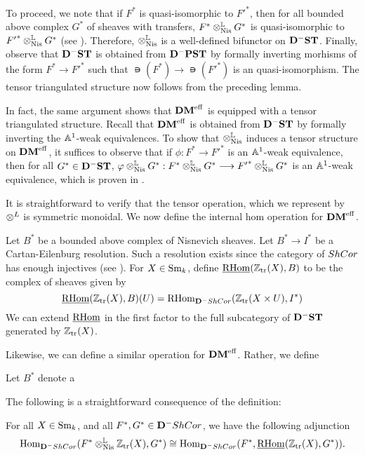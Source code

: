 To proceed, we note that if $F^*$ is quasi-isomorphic to ${F'}^*$,
then for all bounded above complex $G^*$ of sheaves with transfers, 
$F^* \otimes^{\mathbb{L}}_{\mathrm{Nis}} G^*$ is quasi-isomorphic to ${F'}^* \otimes^{\mathbb{L}}_{\mathrm{Nis}} G^*$ (see
\cite[Prop. 8.16]{MVW}). Therefore, $\otimes^{\mathbb{L}}_{\mathrm{Nis}}$ is a well-defined 
bifunctor on $\mathbf{D}^-\mathbf{ST}$. Finally, observe that $\mathbf{D}^-\mathbf{ST}$ is 
obtained from $\mathbf{D}^-\mathbf{PST}$ by formally inverting morhisms of the 
form $F^* \to {F'}^*$ such that $\nis(F^*) \to \nis({F'}^*)$ is an 
quasi-isomorphism. The tensor triangulated structure now follows 
from the preceding lemma.

In fact, the same argument shows that $\mathbf{DM}^{\mathrm{eff}}$ is equipped with a
tensor triangulated structure. Recall that $\mathbf{DM}^{\mathrm{eff}}$ is obtained
from $\mathbf{D}^-\mathbf{ST}$ by formally inverting the $\mathbb{A}^1$-weak equivalences.
To show that $\otimes^{\mathbb{L}}_{\mathrm{Nis}}$ induces a tensor structure on $\mathbf{DM}^{\mathrm{eff}}$, it
suffices to observe that if $\phi : F^* \to {F'}^*$ is an $\mathbb{A}^1$-weak 
equivalence, then for all $G^* \in \mathbf{D}^-\mathbf{ST}$, $\varphi \otimes^{\mathbb{L}}_{\mathrm{Nis}} G^* : 
F^* \otimes^{\mathbb{L}}_{\mathrm{Nis}} G^* \longrightarrow {F'}^* \otimes^{\mathbb{L}}_{\mathrm{Nis}} G^*$ is an $\mathbb{A}^1$-weak 
equivalence, which is proven in \cite[Lemma 9.5]{MVW}.

It is straightforward to verify that the tensor operation, which
we represent by $\otimes^L$ is symmetric monoidal. We now define the 
internal hom operation for $\mathbf{DM}^{\mathrm{eff}}$.

\begin{defn}
Let $B^*$ be a bounded above complex of Nisnevich sheaves. Let $B^*
\to I^*$ be a Cartan-Eilenburg resolution. Such a resolution 
exists since the category of $ShCor$ has enough injectives (see 
\cite[Prop.  6.19]{MVW}). For $X \in \mathrm{Sm}_{k}$, define 
$\underline{\mathrm{RHom}}(\mathbb{Z}_{\mathrm{tr}}(X), B)$ to be the complex of sheaves given by
\[
\underline{\mathrm{RHom}}(\mathbb{Z}_{\mathrm{tr}}(X), B)(U) = \mathrm{RHom}_{\mathbf{D}^-ShCor}(\mathbb{Z}_{\mathrm{tr}}(X \times U),
I^*)
\]
We can extend $\underline{\mathrm{RHom}}$ in the first factor to the full 
subcategory of $\mathbf{D}^-\mathbf{ST}$ generated by $\mathbb{Z}_{\mathrm{tr}}(X)$.
\end{defn}

Likewise, we can define a similar operation for $\mathbf{DM}^{\mathrm{eff}}$. Rather,
we define

\begin{defn}
Let $B^*$ denote a 
\end{defn}


The following is a straightforward consequence of the definition:

\begin{lem}
For all $X \in \mathrm{Sm}_{k}$, and all $F^*, G^* \in \mathbf{D}^-ShCor$, we have
the following adjunction
\[
\mathrm{Hom}_{\mathbf{D}^-ShCor}(F^*\otimes^{\mathbb{L}}_{\mathrm{Nis}} \mathbb{Z}_{\mathrm{tr}}(X), G^*) \cong
\mathrm{Hom}_{\mathbf{D}^-ShCor}(F^*, \underline{\mathrm{RHom}}(\mathbb{Z}_{\mathrm{tr}}(X), G^*)).
\]
\end{lem}

